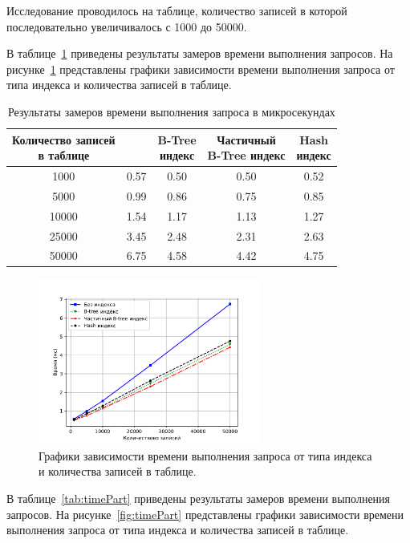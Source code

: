 Исследование проводилось на таблице, количество записей в которой последовательно увеличивалось с 1000 до 50000.


В таблице~\ref{tab:timeIdx} приведены результаты замеров времени выполнения запросов.
На рисунке~\ref{fig:timeIdx} представлены графики зависимости времени выполнения запроса от типа индекса и количества записей в таблице.

\begin{table}[H]
	\begin{center}
		\begin{center}
			\caption{\label{tab:timeIdx}Результаты замеров времени выполнения запроса в микросекундах}
		\end{center}
		\begin{tabular}{|c|c|c|c|c|}
			\hline 
			\specialcell{Количество записей\\ в таблице} & \specialcell{Без индекса} & \specialcell{B-Tree \\индекс} & \specialcell{Частичный \\B-Tree индекс} & \specialcell{Hash\\ индекс}  \\\hline
		1000 & 0.57 & 		0.50 & 0.50 & 		0.52  \\ \hline
		5000 & 0.99 & 		0.86 & 0.75 & 		0.85  \\ \hline
		10000 & 1.54 & 		1.17 & 1.13 & 		1.27  \\ \hline
		25000 & 3.45 & 		2.48 & 2.31 & 		2.63  \\ \hline
		50000 & 6.75 & 		4.58 & 4.42 & 		4.75  \\ \hline
		\end{tabular}
	\end{center}
\end{table}

\begin{figure}[h]
	\centering
	\includegraphics[width=0.65\textwidth, height=0.32\textheight]{research/time}
	\caption{Графики зависимости времени выполнения запроса от типа индекса и количества записей в таблице.}
	\label{fig:timeIdx}
\end{figure}
В таблице~\ref{tab:timePart} приведены результаты замеров времени выполнения запросов.
На рисунке~\ref{fig:timePart} представлены графики зависимости времени выполнения запроса от типа индекса и количества записей в таблице.

